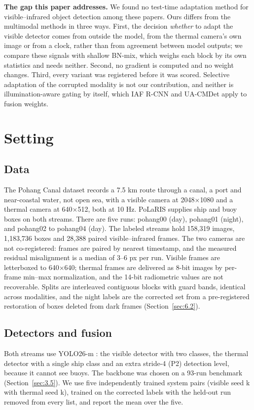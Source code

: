 \documentclass[journal]{IEEEtran}
\begin{document}
\textbf{The gap this paper addresses.} We found no test-time adaptation method for visible--infrared object detection among these papers. Ours differs from the multimodal methods in three ways. First, the decision \emph{whether} to adapt the visible detector comes from outside the model, from the thermal camera's own image or from a clock, rather than from agreement between model outputs; we compare these signals with shallow BN-mix, which weighs each block by its own statistics and needs neither. Second, no gradient is computed and no weight changes. Third, every variant was registered before it was scored. Selective adaptation of the corrupted modality is not our contribution, and neither is illumination-aware gating by itself, which IAF R-CNN and UA-CMDet apply to fusion weights.

\section{Setting}\label{sec:3}
\subsection{Data}\label{sec:3.1}
The Pohang Canal dataset \cite{chung2023pohang} records a 7.5 km route through a canal, a port and near-coastal water, not open sea, with a visible camera at 2048$\times$1080 and a thermal camera at 640$\times$512, both at 10 Hz. PoLaRIS \cite{choi2025polaris} supplies ship and buoy boxes on both streams. There are five runs: pohang00 (day), pohang01 (night), and pohang02 to pohang04 (day). The labeled streams hold 158,319 images, 1,183,736 boxes and 28,388 paired visible--infrared frames. The two cameras are not co-registered: frames are paired by nearest timestamp, and the measured residual misalignment is a median of 3--6 px per run. Visible frames are letterboxed to 640$\times$640; thermal frames are delivered as 8-bit images by per-frame min--max normalization, and the 14-bit radiometric values are not recoverable. Splits are interleaved contiguous blocks with guard bands, identical across modalities, and the night labels are the corrected set from a pre-registered restoration of boxes deleted from dark frames (Section~\ref{sec:6.2}).

\subsection{Detectors and fusion}\label{sec:3.2}
Both streams use YOLO26-m \cite{jocher2026ultralytics}: the visible detector with two classes, the thermal detector with a single ship class and an extra stride-4 (P2) detection level, because it cannot see buoys. The backbone was chosen on a 93-run benchmark (Section~\ref{sec:3.5}). We use five independently trained system pairs (visible seed k with thermal seed k), trained on the corrected labels with the held-out run removed from every list, and report the mean over the five.
\end{document}
